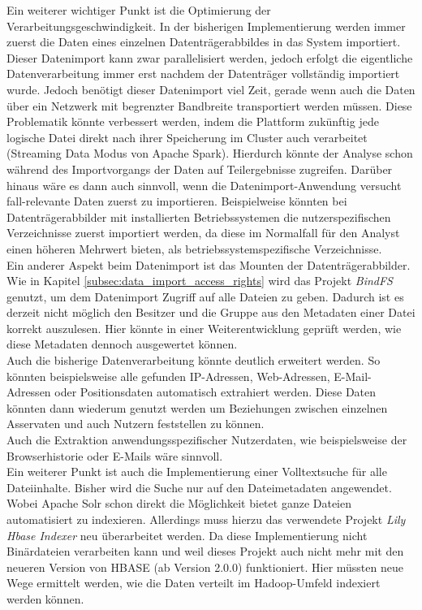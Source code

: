 \noindent
Ein weiterer wichtiger Punkt ist die Optimierung der Verarbeitungsgeschwindigkeit. In der bisherigen Implementierung werden immer zuerst die Daten eines einzelnen Datenträgerabbildes in das System importiert. Dieser Datenimport kann zwar parallelisiert werden, jedoch erfolgt die eigentliche Datenverarbeitung immer erst nachdem der Datenträger vollständig importiert wurde. Jedoch benötigt dieser Datenimport viel Zeit, gerade wenn auch die Daten über ein Netzwerk mit begrenzter Bandbreite transportiert werden müssen. Diese Problematik könnte verbessert werden, indem die Plattform zukünftig jede logische Datei direkt nach ihrer Speicherung im Cluster auch verarbeitet (Streaming Data Modus von Apache Spark). Hierdurch könnte der Analyse schon während des Importvorgangs der Daten auf Teilergebnisse zugreifen. Darüber hinaus wäre es dann auch sinnvoll, wenn die Datenimport-Anwendung versucht fall-relevante Daten zuerst zu importieren. Beispielweise könnten bei Datenträgerabbilder mit installierten Betriebssystemen die nutzerspezifischen Verzeichnisse zuerst importiert werden, da diese im Normalfall für den Analyst einen höheren Mehrwert bieten, als betriebssystemspezifische Verzeichnisse.\\
Ein anderer Aspekt beim Datenimport ist das Mounten der Datenträgerabbilder. Wie in Kapitel \ref{subsec:data_import_access_rights} wird das Projekt \textit{BindFS} genutzt, um dem Datenimport Zugriff auf alle Dateien zu geben. Dadurch ist es derzeit nicht möglich den Besitzer und die Gruppe aus den Metadaten einer Datei korrekt auszulesen. Hier könnte in einer Weiterentwicklung geprüft werden, wie diese Metadaten dennoch ausgewertet können.\\

\noindent
Auch die bisherige Datenverarbeitung könnte deutlich erweitert werden. So könnten beispielsweise alle gefunden IP-Adressen, Web-Adressen, E-Mail-Adressen oder Positionsdaten automatisch extrahiert werden. Diese Daten könnten dann wiederum genutzt werden um Beziehungen zwischen einzelnen Asservaten und auch Nutzern feststellen zu können. \\
Auch die Extraktion anwendungsspezifischer Nutzerdaten, wie beispielsweise der Browserhistorie oder E-Mails wäre sinnvoll.\\
Ein weiterer Punkt ist auch die Implementierung einer Volltextsuche für alle Dateiinhalte. Bisher wird die Suche nur auf den Dateimetadaten angewendet. Wobei Apache Solr schon direkt die Möglichkeit bietet ganze Dateien automatisiert zu indexieren. Allerdings muss hierzu das verwendete Projekt \textit{Lily Hbase Indexer} neu überarbeitet werden. Da diese Implementierung nicht Binärdateien verarbeiten kann und weil dieses Projekt auch nicht mehr mit den neueren Version von HBASE (ab Version 2.0.0) funktioniert. Hier müssten neue Wege ermittelt werden, wie die Daten verteilt im Hadoop-Umfeld indexiert werden können.\\

